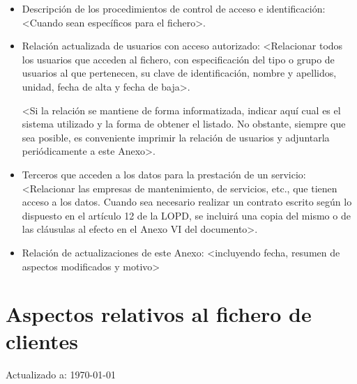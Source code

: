 \documentclass[a4paper,11pt,bibtotoc,noliststotoc]{scrbook}
\begin{document}
\begin{itemize}
\item Descripción de los procedimientos de control de acceso e identificación: <Cuando sean específicos para el fichero>.

\item Relación actualizada de usuarios con acceso autorizado: <Relacionar todos los usuarios que acceden al fichero, con especificación del tipo o grupo de usuarios al que pertenecen, su clave de identificación, nombre y apellidos, unidad, fecha de alta y fecha de baja>.

<Si la relación se mantiene de forma informatizada, indicar aquí cual es el sistema utilizado y la forma de obtener el listado. No obstante, siempre que sea posible, es conveniente imprimir la relación de usuarios y adjuntarla periódicamente a este Anexo>.

\item Terceros que acceden a los datos para la prestación de un servicio: <Relacionar las empresas de mantenimiento, de servicios, etc., que tienen acceso a los datos. Cuando sea necesario realizar un contrato escrito según lo dispuesto en el artículo 12 de la LOPD, se incluirá una copia del mismo o de las cláusulas al efecto en el Anexo VI del documento>.

\item Relación de actualizaciones de este Anexo: <incluyendo fecha, resumen de aspectos modificados y motivo>

\end{itemize}






\section{Aspectos relativos al fichero de clientes}


Actualizado a: \today
\end{document}
